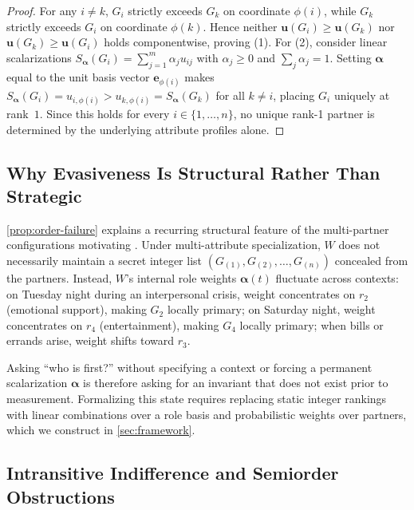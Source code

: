 \begin{proof}
For any $i \neq k$, $G_i$ strictly exceeds $G_k$ on coordinate $\phi(i)$, while
$G_k$ strictly exceeds $G_i$ on coordinate $\phi(k)$. Hence neither
$\mathbf{u}(G_i) \ge \mathbf{u}(G_k)$ nor $\mathbf{u}(G_k) \ge \mathbf{u}(G_i)$
holds componentwise, proving (1). For (2), consider linear scalarizations
$S_{\boldsymbol{\alpha}}(G_i) = \sum_{j=1}^m \alpha_j u_{ij}$ with
$\alpha_j \ge 0$ and $\sum_j \alpha_j = 1$. Setting $\boldsymbol{\alpha}$ equal
to the unit basis vector $\mathbf{e}_{\phi(i)}$ makes
$S_{\boldsymbol{\alpha}}(G_i) = u_{i,\phi(i)} > u_{k,\phi(i)} = S_{\boldsymbol{\alpha}}(G_k)$
for all $k \neq i$, placing $G_i$ uniquely at rank~$1$. Since this holds for
every $i \in \{1, \dots, n\}$, no unique rank-1 partner is determined by the
underlying attribute profiles alone.
\end{proof}

\subsection{Why Evasiveness Is Structural Rather Than Strategic}
\label{subsec:bg-evasiveness}

\noindent\layerbehav{} \cref{prop:order-failure} explains a recurring
structural feature of the multi-partner configurations motivating \RST{}. Under multi-attribute
specialization, $W$ does not necessarily maintain a secret integer list
$(G_{(1)}, G_{(2)}, \dots, G_{(n)})$ concealed from the partners. Instead, $W$'s
internal role weights $\boldsymbol{\alpha}(t)$ fluctuate across contexts: on Tuesday
night during an interpersonal crisis, weight concentrates on $r_2$ (emotional support),
making $G_2$ locally primary; on Saturday night, weight concentrates on $r_4$
(entertainment), making $G_4$ locally primary; when bills or errands arise, weight shifts
toward $r_3$.

Asking ``who is first?'' without specifying a context or forcing a permanent
scalarization $\boldsymbol{\alpha}$ is therefore asking for an invariant that
does not exist prior to measurement. Formalizing this state requires replacing
static integer rankings with linear combinations over a role basis and
probabilistic weights over partners, which we construct in \cref{sec:framework}.

\subsection{Intransitive Indifference and Semiorder Obstructions}
\label{subsec:bg-intransitivity}

